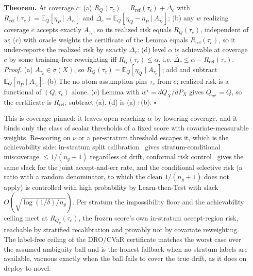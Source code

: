 \documentclass[10pt]{article}
\begin{document}
\textbf{Theorem.} At coverage $c$: (a) $R_Q(\tau_c)=R_{\mathrm{ref}}(\tau_c)+\bar\Delta_c$ with
$R_{\mathrm{ref}}(\tau_c)=\mathbb{E}_Q[\eta_P\mid A_{\tau_c}]$ and $\bar\Delta_c=\mathbb{E}_Q[\eta_Q
-\eta_P\mid A_{\tau_c}]$; (b) any $w$ realizing coverage $c$ accepts exactly $A_{\tau_c}$, so its
realized risk equals $R_Q(\tau_c)$, independent of $w$; (c) with oracle weights the certificate of
the Lemma equals $R_{\mathrm{ref}}(\tau_c)$, so it under-reports the realized risk by exactly
$\bar\Delta_c$; (d) level $\alpha$ is achievable at coverage $c$ by some training-free reweighting
iff $R_Q(\tau_c)\le\alpha$, i.e. $\bar\Delta_c\le\alpha-R_{\mathrm{ref}}(\tau_c)$.
\emph{Proof.} (a) $A_{\tau_c}\in\sigma(X)$, so $R_Q(\tau_c)=\mathbb{E}_Q[\eta_Q\mid A_{\tau_c}]$; add
and subtract $\mathbb{E}_Q[\eta_P\mid A_{\tau_c}]$. (b) The no-atom assumption pins $\tau_c$ from
$c$; realized risk is a functional of $(Q,\tau_c)$ alone. (c) Lemma with $w^\star=dQ_X/dP_X$ gives
$Q_{w^\star}=Q$, so the certificate is $R_{\mathrm{ref}}$; subtract (a). (d) is (a)+(b). $\square$

This is coverage-pinned: it leaves open reaching $\alpha$ by lowering coverage, and it binds only the
class of scalar thresholds of a fixed score with covariate-measurable weights. Re-scoring on $\nu$ or
a per-stratum threshold escapes it, which is the achievability side:
in-stratum split calibration~\citep{vovk2005} gives stratum-conditional miscoverage $\le 1/(n_g{+}1)$
regardless of drift, conformal risk control~\citep{angelopoulos2024crc} gives the same slack for the joint accept-and-err rate, and the
conditional selective risk (a ratio with a random denominator, to which the clean $1/(n_g{+}1)$ does
not apply) is controlled with high probability by Learn-then-Test with slack
$O(\sqrt{\log(1/\delta)/n_g})$. Per stratum the impossibility floor and the achievability ceiling
meet at $R_{Q_g}(\tau_c)$, the frozen score's own in-stratum accept-region risk, reachable by
stratified recalibration and provably not by covariate reweighting. The label-free ceiling of the
DRO/CVaR certificate matches the worst case over the assumed ambiguity ball and is the honest
fallback when no stratum labels are available, vacuous exactly when the ball fails to cover the true
drift, as it does on deploy-to-novel.
\end{document}
